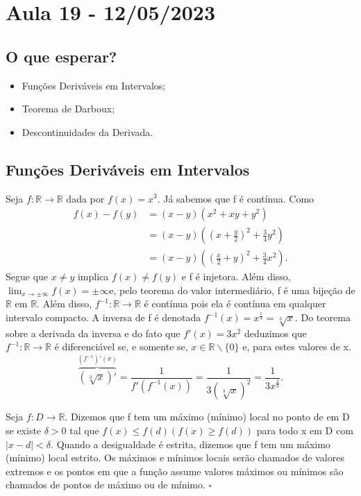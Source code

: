 \documentclass[analysis_notes.tex]{subfiles}
\begin{document}
\section{Aula 19 - 12/05/2023}
\subsection{O que esperar?}
\begin{itemize}
	\item Fun\c cões Deriváveis em Intervalos;
	\item Teorema de Darboux;
	\item Descontinuidades da Derivada.
\end{itemize}

\subsection{Fun\c cões Deriváveis em Intervalos}
\begin{example}
	Seja \(f:\mathbb{R}\rightarrow \mathbb{R}\) dada por \(f(x) = x^{3}\). Já
	sabemos que f é contínua. Como
	\begin{align*}
		f(x) - f(y) & =(x-y)(x^{2}+xy+y^{2})                        \\
		            & =(x-y)((x+\frac{y}{2})^{2}+\frac{3}{4}y^{2})  \\
		            & =(x-y)((\frac{x}{2}+y)^{2}+\frac{3}{4}x^{2}).
	\end{align*}
	Segue que \(x\neq y\) implica \(f(x)\neq f(y)\) e f é injetora. Além disso,
	\(\lim_{x\to \pm\infty}f(x)=\pm\infty\)e, pelo teorema do valor intermediário,
	f é uma bije\c cão de \(\mathbb{R}\) em \(\mathbb{R}\). Além disso,
	\(f^{-1}:\mathbb{R}\rightarrow \mathbb{R}\) é contínua pois ela é contínua em
	qualquer intervalo compacto. A inversa de f é denotada \(f^{-1}(x) = x^{\frac{1}{3}} = \sqrt[3]{x}.\)
	Do teorema sobre a derivada da inversa e do fato que \(f'(x) = 3x^{2}\)
	deduzimos que \(f^{-1}:\mathbb{R}\rightarrow \mathbb{R}\) é diferenciável se,
	e somente se, \(x\in \mathbb{R}\backslash\{0\}\) e, para estes valores de x.
	\[
		\overbrace{(\sqrt[3]{x})'}^{(f^{-1})'(x)} = \frac{1}{f'(f^{-1}(x))} = \frac{1}{3(\sqrt[3]{x})^{2}} = \frac{1}{3x^{\frac{2}{3}}}.
	\]
\end{example}
\begin{def*}
	Seja \(f:D\rightarrow \mathbb{R}\). Dizemos que f tem um máximo (mínimo) local no
	ponto de em D se existe \(\delta >0\) tal que \(f(x)\leq f(d) (f(x)\geq f(d))\)
	para todo x em D com \(|x-d| < \delta .\) Quando a desigualdade é estrita,
	dizemos que f tem um máximo (mínimo) local estrito. Os máximos e mínimos locais
	serão chamados de valores extremos e os pontos em que a fun\c cão assume valores máximos
	ou mínimos são chamados de pontos de máximo ou de mínimo. \(\square\)
\end{def*}
\end{document}
